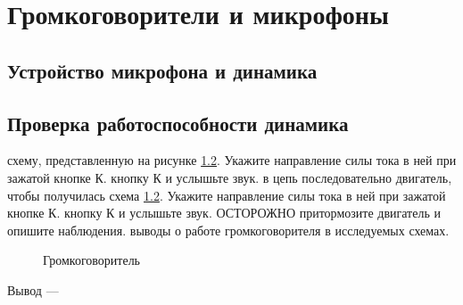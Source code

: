 \section{Громкоговорители и микрофоны}    


\subsection{Устройство микрофона и динамика}


\subsection{Проверка работоспособности динамика}

\begin{enumerate}
     схему, представленную на рисунке \ref{}. Укажите направление силы тока в ней при зажатой кнопке К.
     кнопку К и услышьте звук.
     в цепь последовательно двигатель, чтобы получилась схема \ref{}. Укажите направление силы тока в ней при зажатой кнопке К.
     кнопку К и услышьте звук. ОСТОРОЖНО притормозите двигатель и опишите наблюдения.
     выводы о работе громкоговорителя в исследуемых схемах. 
\end{enumerate}


\begin{figure}[h]
\begin{minipage}[h]{0.5\linewidth}
\end{minipage}
\hfill
\begin{minipage}[h]{0.5\linewidth}
\end{minipage}
\caption{Громкоговоритель}
\label{ris:10.1}
\end{figure}



Вывод --- \hrulefill

\hrulefill

\hrulefill

